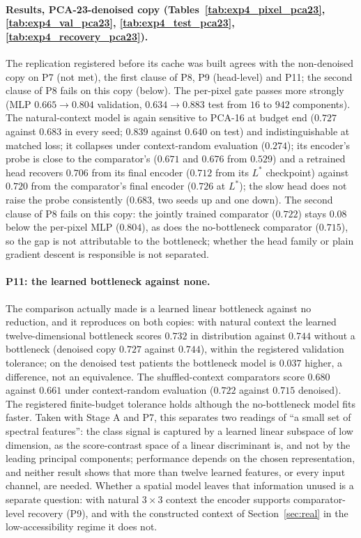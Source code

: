 \paragraph{Results, PCA-23-denoised copy (Tables~\ref{tab:exp4_pixel_pca23},
\ref{tab:exp4_val_pca23}, \ref{tab:exp4_test_pca23}, \ref{tab:exp4_recovery_pca23}).}
The replication registered before its cache was built agrees with the non-denoised copy
on P7 (not met), the first clause of P8, P9 (head-level) and P11; the second clause of
P8 fails on this copy (below). The per-pixel gate passes more strongly (MLP $0.665\to0.804$
validation, $0.634\to0.883$ test from $16$ to $942$ components). The natural-context
model is again sensitive to PCA-16 at budget end ($0.727$ against $0.683$ in every
seed; $0.839$ against $0.640$ on test) and indistinguishable at matched loss; it
collapses under context-random evaluation ($0.274$); its encoder's probe is close to the
comparator's ($0.671$ and $0.676$ from $0.529$) and a retrained head recovers $0.706$
from its final encoder ($0.712$ from its $L^\ast$ checkpoint) against $0.720$ from the
comparator's final encoder ($0.726$ at $L^\ast$); the slow head does not raise the
probe consistently ($0.683$, two seeds up and one down). The second clause of P8 fails
on this copy: the jointly trained comparator ($0.722$) stays $0.08$ below the per-pixel
MLP ($0.804$), as does the no-bottleneck comparator ($0.715$), so the gap is not
attributable to the bottleneck; whether the head family or plain gradient descent is
responsible is not separated.

\paragraph{P11: the learned bottleneck against none.} The comparison
\citet{oleary2026spatial} actually made is a learned linear bottleneck against no
reduction, and it reproduces on both copies: with natural context the learned
twelve-dimensional bottleneck scores $0.732$ in distribution against $0.744$ without a
bottleneck (denoised copy $0.727$ against $0.744$), within the registered validation
tolerance; on the denoised test patients the bottleneck model is $0.037$ higher, a
difference, not an equivalence. The shuffled-context comparators score $0.680$ against
$0.661$ under context-random evaluation ($0.722$ against $0.715$ denoised). The
registered finite-budget tolerance holds although the no-bottleneck model fits faster.
Taken with Stage A and P7, this separates two readings of ``a small set of spectral
features'': the class signal is captured by a learned linear subspace of low dimension,
as the score-contrast space of a linear discriminant is, and not by the leading
principal components; performance depends on the chosen representation, and neither
result shows that more than twelve learned features, or every input channel, are
needed. Whether a spatial model leaves that information unused is a separate question:
with natural $3\times3$ context the encoder supports comparator-level recovery (P9), and
with the constructed context of Section~\ref{sec:real} in the low-accessibility regime
it does not.


